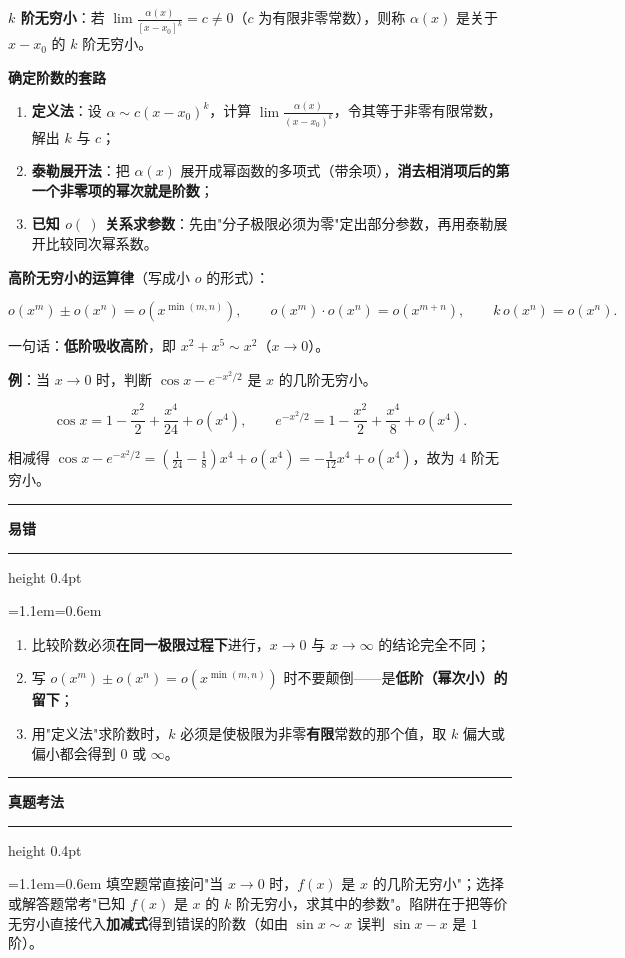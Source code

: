 \documentclass[11pt,openany,UTF8]{ctexbook}
\newcommand{\callouthead}[2]{%
  \par\addvspace{7pt}\noindent
  {\color{#1}\rule[-0.15em]{3pt}{1.05em}}\hspace{0.5em}%
  {\bfseries\color{#1}#2}\par\nobreak\vspace{-0.35em}%
  {\color{rulesep}\hrule height 0.4pt}\nobreak\vspace{0.45em}%
  \begingroup\small\setlength{\parindent}{0pt}%
  \leftskip=1.1em\rightskip=0.6em\noindent\ignorespaces}
\newcommand{\calloutend}{\par\endgroup\addvspace{7pt}}
\newenvironment{callwarn}[1]{\callouthead{warnbar}{#1}}{\calloutend}
\newenvironment{callexam}[1]{\callouthead{exambar}{#1}}{\calloutend}
\begin{document}
\textbf{$k$ 阶无穷小}：若 $\lim\frac{\alpha(x)}{[x-x_0]^{k}}=c\ne 0$（$c$ 为有限非零常数），则称 $\alpha(x)$ 是关于 $x-x_0$ 的 $k$ 阶无穷小。

\textbf{确定阶数的套路}

\begin{enumerate}
\item \textbf{定义法}：设 $\alpha\sim c(x-x_0)^k$，计算 $\lim\frac{\alpha(x)}{(x-x_0)^k}$，令其等于非零有限常数，解出 $k$ 与 $c$；
\item \textbf{泰勒展开法}：把 $\alpha(x)$ 展开成幂函数的多项式（带余项），\textbf{消去相消项后的第一个非零项的幂次就是阶数}；
\item \textbf{已知 $o(\ )$ 关系求参数}：先由"分子极限必须为零"定出部分参数，再用泰勒展开比较同次幂系数。
\end{enumerate}
\textbf{高阶无穷小的运算律}（写成小 $o$ 的形式）：

\[o(x^m)\pm o(x^n)=o(x^{\min(m,n)}),\qquad o(x^m)\cdot o(x^n)=o(x^{m+n}),\qquad k\,o(x^n)=o(x^n).\]

一句话：\textbf{低阶吸收高阶}，即 $x^2+x^5\sim x^2$（$x\to 0$）。

\textbf{例}：当 $x\to 0$ 时，判断 $\cos x-e^{-x^2/2}$ 是 $x$ 的几阶无穷小。

\[\cos x=1-\frac{x^2}{2}+\frac{x^4}{24}+o(x^4),\qquad e^{-x^2/2}=1-\frac{x^2}{2}+\frac{x^4}{8}+o(x^4).\]

相减得 $\cos x-e^{-x^2/2}=\left(\frac{1}{24}-\frac{1}{8}\right)x^4+o(x^4)=-\frac{1}{12}x^4+o(x^4)$，故为 $4$ 阶无穷小。

\begin{callwarn}{易错}
\begin{enumerate}
\item 比较阶数必须\textbf{在同一极限过程下}进行，$x\to 0$ 与 $x\to\infty$ 的结论完全不同；
\item 写 $o(x^m)\pm o(x^n)=o(x^{\min(m,n)})$ 时不要颠倒——是\textbf{低阶（幂次小）的留下}；
\item 用"定义法"求阶数时，$k$ 必须是使极限为非零\textbf{有限}常数的那个值，取 $k$ 偏大或偏小都会得到 $0$ 或 $\infty$。
\end{enumerate}
\end{callwarn}

\begin{callexam}{真题考法}
填空题常直接问"当 $x\to 0$ 时，$f(x)$ 是 $x$ 的几阶无穷小"；选择或解答题常考"已知 $f(x)$ 是 $x$ 的 $k$ 阶无穷小，求其中的参数"。陷阱在于把等价无穷小直接代入\textbf{加减式}得到错误的阶数（如由 $\sin x\sim x$ 误判 $\sin x-x$ 是 $1$ 阶）。

\end{callexam}
\end{document}
